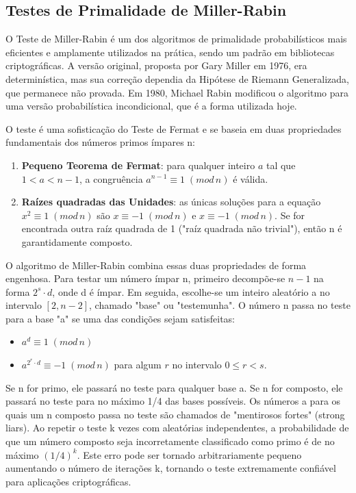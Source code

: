 \documentclass[a4paper, 11pt]{article}
\begin{document}
\subsection{Testes de Primalidade de Miller-Rabin}

O Teste de Miller-Rabin é um dos algoritmos de primalidade probabilísticos mais eficientes e amplamente utilizados na prática, sendo um padrão em bibliotecas criptográficas. A versão original, proposta por Gary Miller em 1976, era determinística, mas sua correção dependia da Hipótese de Riemann Generalizada, que permanece não provada. Em 1980, Michael Rabin modificou o algoritmo para uma versão probabilística incondicional, que é a forma utilizada hoje. \parencite{rabin1980}

O teste é uma sofisticação do Teste de Fermat e se baseia em duas propriedades fundamentais dos números primos ímpares n: \parencite{kleinberg2010miller}
\begin{enumerate}
    \item \textbf{Pequeno Teorema de Fermat}: para qualquer inteiro $a$ tal que $1 < a < n-1$, a congruência $a^{n-1} \equiv 1 \;(mod \,n)$ é válida.
    \item \textbf{Raízes quadradas das Unidades}: as únicas soluções para a equação $x^2 \equiv 1 \; (mod \, n)$ são $x \equiv -1 \; (mod \, n)$ e $x \equiv -1 \; (mod \, n)$. Se for encontrada outra raíz quadrada de 1 ("raíz quadrada não trivial"), então n é garantidamente composto. \parencite{wikipedia_miller_rabin}
\end{enumerate}

O algoritmo de Miller-Rabin combina essas duas propriedades de forma engenhosa. Para testar um número ímpar n, primeiro decompõe-se $n-1$ na forma $2^s \cdot d$, onde d é ímpar. Em seguida, escolhe-se um inteiro aleatório a no intervalo $[2, n-2]$, chamado "base" ou "testemunha". O número n passa no teste para a base "a" se uma das condições sejam satisfeitas:
\begin{itemize}
    \item $a^d \equiv1 \; (mod \, n)$
    \item $a^{2^r \cdot d} \equiv -1 \; (mod \, n)$ para algum $r$ no intervalo $0 \leq r < s$.
\end{itemize}

Se n for primo, ele passará no teste para qualquer base a. Se n for composto, ele passará no teste para no máximo 1/4 das bases possíveis. Os números a para os quais um n composto passa no teste são chamados de "mentirosos fortes" (strong liars). Ao repetir o teste k vezes com aleatórias independentes, a probabilidade de que um número composto seja incorretamente classificado como primo é de no máximo $(1/4)^k$. Este erro pode ser tornado arbitrariamente pequeno aumentando o número de iterações k, tornando o teste extremamente confiável para aplicações criptográficas. 
\end{document}
